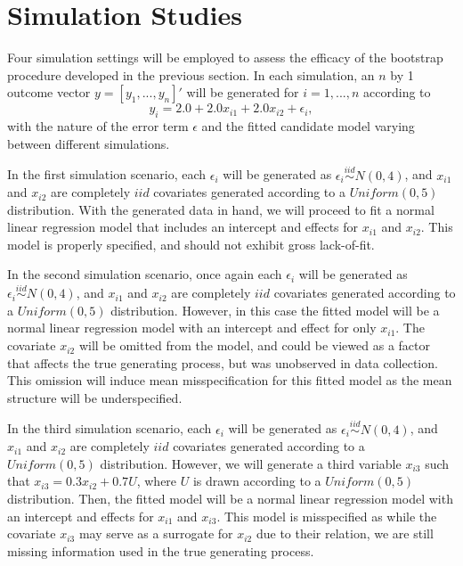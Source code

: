 \documentclass[12pt]{article} %
\theoremstyle{definition}
\begin{document}
\section{Simulation Studies}

Four simulation settings will be employed to assess the efficacy of the bootstrap procedure developed in the previous section. In each simulation, an $n$ by 1 outcome vector $y = [y_1,...,y_n]'$ will
be generated for $i = 1,...,n$ according to
\begin{equation*}
	y_i = 2.0 + 2.0 x_{i1} + 2.0 x_{i2} + \epsilon_i , 
\end{equation*}
with the nature of the error term $\epsilon$ and the fitted candidate model varying between different simulations.

In the first simulation scenario, each $\epsilon_i$ will be generated as $\epsilon_i \stackrel{iid}{\sim} N(0,4)$, and $x_{i1}$ and $x_{i2}$ are completely $iid$ covariates generated according to
a $Uniform(0,5)$ distribution. With the generated data in hand, we will proceed to fit a normal linear regression model that includes an intercept and effects for $x_{i1}$ and $x_{i2}$. This model
is properly specified, and should not exhibit gross lack-of-fit.

In the second simulation scenario, once again each $\epsilon_i$ will be generated as $\epsilon_i \stackrel{iid}{\sim} N(0,4)$, and $x_{i1}$ and $x_{i2}$ are completely $iid$ covariates generated according to
a $Uniform(0,5)$ distribution. However, in this case the fitted model will be a normal linear regression model with an intercept and effect for only
$x_{i1}$. The covariate $x_{i2}$ will be omitted from the model, and could be viewed as a factor that affects the true generating process, but
was unobserved in data collection. This omission will induce mean misspecification for this fitted model as the mean structure will be underspecified.

In the third simulation scenario, each $\epsilon_i$ will be generated as $\epsilon_i \stackrel{iid}{\sim} N(0,4)$, and $x_{i1}$ and $x_{i2}$ are completely $iid$ covariates generated according to
a $Uniform(0,5)$ distribution. However, we will generate a third variable $x_{i3}$ such that $x_{i3} = 0.3 x_{i2} + 0.7 U$, where $U$ is drawn according to a $Uniform(0,5)$ distribution.
Then, the fitted model will be a normal linear regression model with an intercept and effects for $x_{i1}$ and $x_{i3}$. This model is misspecified as while the covariate $x_{i3}$ 
may serve as a surrogate for $x_{i2}$ due to their relation, we are still missing information used in the true generating process.
\end{document}
